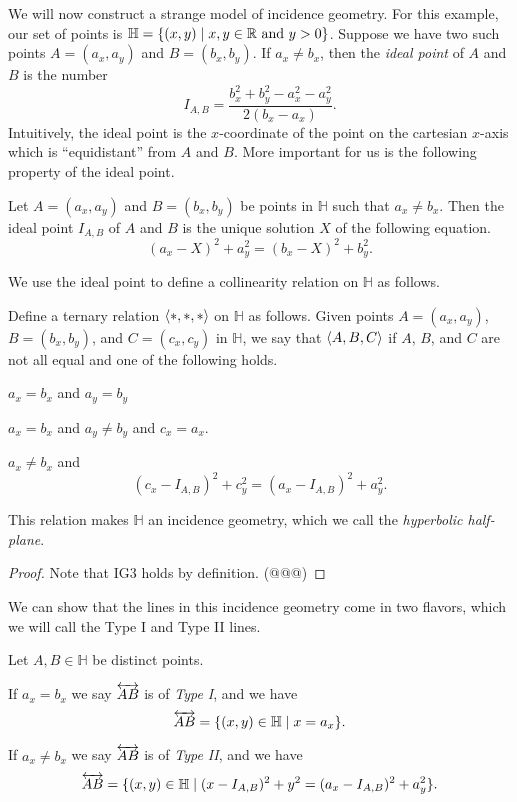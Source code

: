 We will now construct a strange model of incidence geometry.
For this example, our set of points is \(\mathbb{H} = \{ (x,y) \mid x,y \in \mathbb{R}\ \mathrm{and}\ y > 0 \}\).
Suppose we have two such points \(A = (a_x, a_y)\) and \(B = (b_x, b_y)\).
If \(a_x \neq b_x\), then the \emph{ideal point} of \(A\) and \(B\) is the number \[ I_{A,B} = \frac{b_x^2 + b_y^2 - a_x^2 - a_y^2}{2(b_x - a_x)}. \]
Intuitively, the ideal point is the \(x\)-coordinate of the point on the cartesian \(x\)-axis which is ``equidistant'' from \(A\) and \(B\).
More important for us is the following property of the ideal point.

\begin{lem}
Let \(A = (a_x, a_y)\) and \(B = (b_x, b_y)\) be points in \(\mathbb{H}\) such that \(a_x \neq b_x\).
Then the ideal point \(I_{A,B}\) of \(A\) and \(B\) is the unique solution \(X\) of the following equation.
\[ (a_x - X)^2 + a_y^2 = (b_x - X)^2 + b_y^2. \]
\end{lem}

We use the ideal point to define a collinearity relation on \(\mathbb{H}\) as follows.

\begin{prop}\label{prop:hyp-half-plane}
Define a ternary relation \(\langle \ast, \ast, \ast \rangle\) on \(\mathbb{H}\) as follows.
Given points \(A = (a_x, a_y)\), \(B = (b_x, b_y)\), and \(C = (c_x, c_y)\) in \(\mathbb{H}\), we say that \(\langle A, B, C \rangle\) if \(A\), \(B\), and \(C\) are not all equal and one of the following holds.
\begin{proplist}
\item \(a_x = b_x\) and \(a_y = b_y\)
\item \(a_x = b_x\) and \(a_y \neq b_y\) and \(c_x = a_x\).
\item \(a_x \neq b_x\) and \[ (c_x - I_{A,B})^2 + c_y^2 = (a_x - I_{A,B})^2 + a_y^2. \]
\end{proplist}
This relation makes \(\mathbb{H}\) an incidence geometry, which we call the \emph{hyperbolic half-plane}.
\end{prop}

\begin{proof}
Note that IG3 holds by definition. (@@@)
\end{proof}

We can show that the lines in this incidence geometry come in two flavors, which we will call the Type I and Type II lines.

\begin{cor}
Let \(A, B \in \mathbb{H}\) be distinct points.
\begin{proplist}
\item If \(a_x = b_x\) we say \(\overleftrightarrow{AB}\) is of \emph{Type I}, and we have \[ \overleftrightarrow{AB} = \{ (x,y) \in \mathbb{H} \mid x = a_x \}. \]
\item If \(a_x \neq b_x\) we say \(\overleftrightarrow{AB}\) is of \emph{Type II}, and we have \[ \overleftrightarrow{AB} = \{ (x,y) \in \mathbb{H} \mid (x - I_{A,B})^2 + y^2 = (a_x - I_{A,B})^2 + a_y^2 \}. \]
\end{proplist}
\end{cor}

